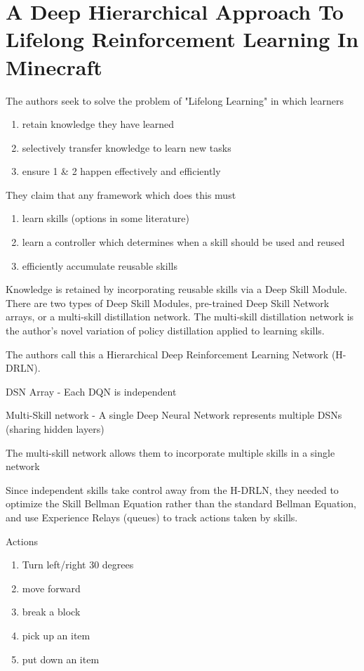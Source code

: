 \section{A Deep Hierarchical Approach To Lifelong Reinforcement Learning In Minecraft}

The authors seek to solve the problem of "Lifelong Learning" in which learners
\begin{enumerate}
\item 
retain knowledge they have learned
\item
selectively transfer knowledge to learn new tasks
\item
ensure 1 \& 2 happen effectively and efficiently
\end{enumerate}

They claim that any framework which does this must 
\begin{enumerate}
\item
learn skills (options in some literature)
\item
learn a controller which determines when a skill should be used and reused
\item
efficiently accumulate reusable skills
\end{enumerate}

Knowledge is retained by incorporating reusable skills via a Deep Skill Module. There are two types of Deep Skill Modules, pre-trained Deep Skill Network arrays, or a multi-skill distillation network. The multi-skill distillation network is the author's novel variation of policy distillation applied to learning skills.

The authors call this a Hierarchical Deep Reinforcement Learning Network (H-DRLN).

DSN Array
- Each DQN is independent

Multi-Skill network
- A single Deep Neural Network represents multiple DSNs (sharing hidden layers)

The multi-skill network allows them to incorporate multiple skills in a single network

Since independent skills take control away from the H-DRLN, they needed to optimize the Skill Bellman Equation rather than the standard Bellman Equation, and use Experience Relays (queues) to track actions taken by skills.

Actions
\begin{enumerate}
\item
Turn left/right 30 degrees
\item
move forward
\item
break a block
\item
pick up an item
\item
put down an item
\end{enumerate}

